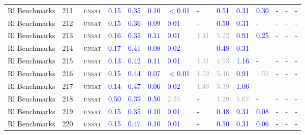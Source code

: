 \begin{center}
{\begin{longtable}{@{}llllllllllllll@{}}
Rl Benchmarks & 211 & ~\textsc{unsat} & \textcolor{blue}{0.15} & \textcolor{blue}{0.35} & \textcolor{blue}{0.10} & \textcolor{blue}{$<$0.01} & - & \textcolor{blue}{0.51} & \textcolor{blue}{0.31} & \textcolor{blue}{0.30} & - & - & - \\
Rl Benchmarks & 212 & ~\textsc{unsat} & \textcolor{blue}{0.15} & \textcolor{blue}{0.36} & \textcolor{blue}{0.09} & \textcolor{blue}{0.01} & - & \textcolor{blue}{0.50} & \textcolor{blue}{0.31} & - & - & - & - \\
Rl Benchmarks & 213 & ~\textsc{unsat} & \textcolor{blue}{0.16} & \textcolor{blue}{0.35} & \textcolor{blue}{0.11} & \textcolor{blue}{0.01} & \textcolor{darkgray}{1.41} & \textcolor{darkgray}{5.22} & \textcolor{blue}{0.91} & \textcolor{blue}{0.25} & - & - & - \\
Rl Benchmarks & 214 & ~\textsc{unsat} & \textcolor{blue}{0.17} & \textcolor{blue}{0.41} & \textcolor{blue}{0.08} & \textcolor{blue}{0.02} & - & \textcolor{blue}{0.48} & \textcolor{blue}{0.31} & - & - & - & - \\
Rl Benchmarks & 215 & ~\textsc{unsat} & \textcolor{blue}{0.13} & \textcolor{blue}{0.42} & \textcolor{blue}{0.11} & \textcolor{blue}{0.01} & \textcolor{darkgray}{1.31} & \textcolor{darkgray}{4.93} & \textcolor{blue}{1.16} & - & - & - & - \\
Rl Benchmarks & 216 & ~\textsc{unsat} & \textcolor{blue}{0.15} & \textcolor{blue}{0.44} & \textcolor{blue}{0.07} & \textcolor{blue}{$<$0.01} & \textcolor{darkgray}{1.52} & \textcolor{darkgray}{5.46} & \textcolor{blue}{0.91} & \textcolor{darkgray}{1.59} & - & - & - \\
Rl Benchmarks & 217 & ~\textsc{unsat} & \textcolor{blue}{0.14} & \textcolor{blue}{0.47} & \textcolor{blue}{0.06} & \textcolor{blue}{0.02} & \textcolor{darkgray}{1.48} & \textcolor{darkgray}{5.39} & \textcolor{blue}{1.06} & - & - & - & - \\
Rl Benchmarks & 218 & ~\textsc{unsat} & \textcolor{blue}{0.50} & \textcolor{blue}{0.39} & \textcolor{blue}{0.50} & \textcolor{darkgray}{2.55} & - & \textcolor{darkgray}{1.29} & \textcolor{darkgray}{5.67} & - & - & - & - \\
Rl Benchmarks & 219 & ~\textsc{unsat} & \textcolor{blue}{0.15} & \textcolor{blue}{0.35} & \textcolor{blue}{0.10} & \textcolor{blue}{0.01} & - & \textcolor{blue}{0.48} & \textcolor{blue}{0.31} & \textcolor{blue}{0.08} & - & - & - \\
Rl Benchmarks & 220 & ~\textsc{unsat} & \textcolor{blue}{0.15} & \textcolor{blue}{0.47} & \textcolor{blue}{0.10} & \textcolor{blue}{0.01} & - & \textcolor{blue}{0.50} & \textcolor{blue}{0.31} & \textcolor{blue}{0.06} & - & - & - \\

\end{longtable}}
\end{center}
